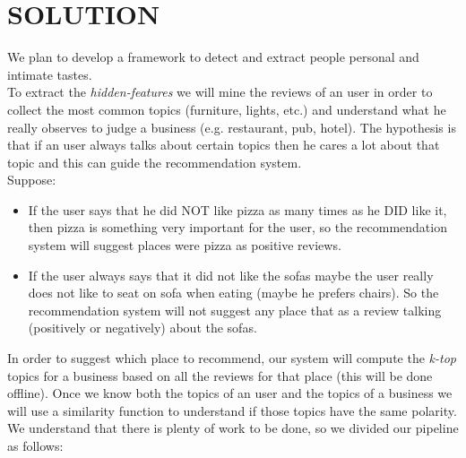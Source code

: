 \documentclass[a4paper, 10pt, conference]{ieeeconf}      %
\begin{document}
\section{SOLUTION}
We plan to develop a framework to detect and extract people personal and intimate tastes.\\
To extract the \textit{hidden-features} we will mine the reviews of an user in order to collect the most common topics (furniture, lights, etc.) and  understand what he really observes to judge a business (e.g. restaurant, pub, hotel).
 The hypothesis is that if an user always talks about certain topics then he cares a lot about that topic and this can guide the recommendation system.\\
Suppose:
\begin{itemize}
	\item If the user says that he did NOT like pizza as many times as he DID like it, then pizza is something very important for the user, so the recommendation system will suggest places were pizza as positive reviews.
	\item If the user always says that it did not like the sofas maybe the user really does not like to seat on sofa when eating (maybe he prefers chairs). So the recommendation system will not suggest any place that as a review talking (positively or negatively) about the sofas.
\end{itemize}
In order to suggest which place to recommend, our system will compute the \textit{k-top} topics for a business based on all the reviews for that place (this will be done offline). Once we know both the topics of an user and the topics of a business we will use a similarity function to understand if those topics have the same polarity.
We understand that there is plenty of work to be done, so we divided our pipeline as follows:\\
\end{document}
